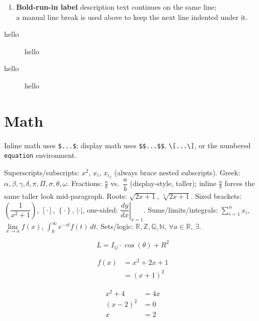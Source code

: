 \documentclass{article}
\newcommand{\set}[1]{\setlength\itemsep{#1em}} %
\begin{document}
\begin{enumerate}[leftmargin=*,label=]
    \set{0.5} %
    \item \textbf{Bold-run-in label} description text continues on the same line;\\
        a manual line break is used above to keep the next line indented under it.
\end{enumerate}

\begin{description}
    \item[hello] hello
    \item[hello] hello
\end{description}

\section{Math}

Inline math uses \verb|$...$|; display math uses \verb|$$...$$|, \verb|\[...\]|,
or the numbered \verb|equation| environment.

Superscripts/subscripts: $x^2$, $x_i$, $x_{i_2}$ (always brace nested subscripts).
Greek: $\alpha, \beta, \gamma, \delta, \pi, \Pi, \sigma, \theta, \omega$.
Fractions: $\frac{a}{b}$ vs.\ $\dfrac{a}{b}$ (display-style, taller); inline
$\displaystyle\frac{a}{b}$ forces the same taller look mid-paragraph.
Roots: $\sqrt{2x+1}$, $\sqrt[5]{2x+1}$.
Sized brackets: $\left(\dfrac{1}{x^2+1}\right)$, $\left[\cdot\right]$,
$\left\{\cdot\right\}$, $\left|\cdot\right|$, one-sided: $\left.\dfrac{dy}{dx}\right|_{x=1}$.
Sums/limits/integrals: $\sum_{i=1}^{n} x_i$, $\lim\limits_{x \to a} f(x)$,
$\int_{0}^{\infty} e^{-st} f(t)\,dt$.
Sets/logic: $\mathbb{R}, \mathbb{Z}, \mathbb{Q}, \mathbb{N}$, $\forall a \in \mathbb{R}$,
$\exists$.

\begin{equation}
    L = I_{ij} \cdot \cos(\theta) + R^2 \label{eq:sample}
\end{equation}

\begin{equation}
\begin{split}
    f(x) &= x^2 + 2x + 1 \\
         &= (x+1)^2
\end{split}
\end{equation}

\begin{align}
    x^2 + 4 &= 4x \\
    (x-2)^2 &= 0 \\
    x &= 2
\end{align}
\end{document}
